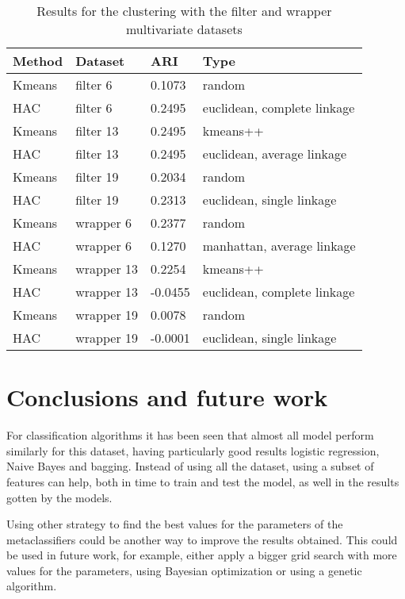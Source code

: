 \documentclass[a4paper,11pt]{article}
\begin{document}
\begin{table}
\centering
\begin{tabular}{|l|l|l|l|}
\hline

\textbf{Method} & \textbf{Dataset} & \textbf{ARI} & \textbf{Type} \\ \hline
Kmeans & filter 6 & 0.1073 & random \\ \hline
HAC & filter 6 & 0.2495 & euclidean, complete linkage \\ \hline
Kmeans & filter 13 & 0.2495 & kmeans++ \\ \hline
HAC & filter 13 & 0.2495 & euclidean, average linkage \\ \hline
Kmeans & filter 19 & 0.2034 & random \\ \hline
HAC & filter 19 & 0.2313 & euclidean, single linkage \\ \hline
Kmeans & wrapper 6 & 0.2377 & random \\ \hline
HAC & wrapper 6 & 0.1270 & manhattan, average linkage \\ \hline
Kmeans & wrapper 13 & 0.2254 & kmeans++ \\ \hline
HAC & wrapper 13 & -0.0455 & euclidean, complete linkage \\ \hline
Kmeans & wrapper 19 & 0.0078 & random \\ \hline
HAC & wrapper 19 & -0.0001 & euclidean, single linkage \\ \hline

\end{tabular}
\caption{Results for the clustering with the filter and wrapper multivariate datasets}
\label{cl:mul}
\end{table}


\section{Conclusions and future work}

For classification algorithms it has been seen that almost all model perform similarly for this dataset, having particularly good results logistic regression, Naive Bayes and bagging. Instead of using all the dataset, using a subset of features can help, both in time to train and test the model, as well in the results gotten by the models.

Using other strategy to find the best values for the parameters of the metaclassifiers could be another way to improve the results obtained. This could be used in future work, for example, either apply a bigger grid search with more values for the parameters, using Bayesian optimization or using a genetic algorithm.
\end{document}

